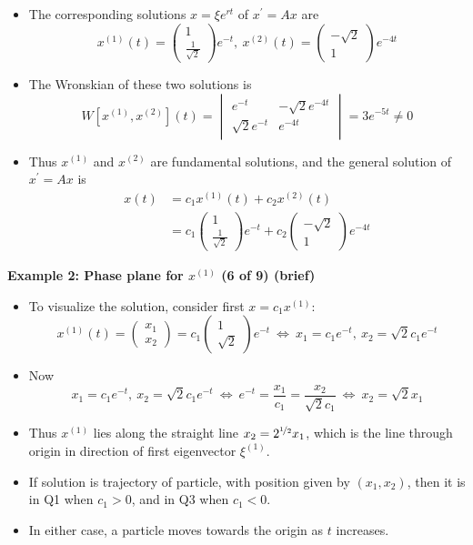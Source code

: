 \documentclass[11pt,a4paper]{article}
\begin{document}
	\begin{itemize}
		\item The corresponding solutions $x = \xi e^{rt}$ of $x^\prime = Ax$ are
		$$
		x^{(1)}(t)=
		\begin{pmatrix}
			1\\
			\frac{1}{\sqrt{2}}
		\end{pmatrix}e^{-t},\ 
		x^{(2)}(t) =
		\begin{pmatrix}
			-\sqrt{2}\\
			1
		\end{pmatrix}e^{-4t}
		$$
		\item The Wronskian of these two solutions is
		$$
		W[x^{(1)},x^{(2)}](t) =
		\begin{vmatrix}
			e^{-t} & -\sqrt{2}e^{-4t}\\
			\sqrt{2}e^{-t} & e^{-4t}
		\end{vmatrix} = 3e^{-5t} \neq 0
		$$
		\item Thus $x^{(1)}$ and $x^{(2)}$ are fundamental solutions, and the general solution of $x^\prime = Ax$ is
		\begin{align*}
			x(t) &= c_1x^{(1)}(t) + c_2x^{(2)}(t)\\
			&= c_1
			\begin{pmatrix}
				1\\
				\frac{1}{\sqrt{2}}
			\end{pmatrix}e^{-t} + c_2
			\begin{pmatrix}
				-\sqrt{2}\\
				1
			\end{pmatrix}e^{-4t}
		\end{align*}
	\end{itemize}
	\textbf{Example 2: Phase plane for $x^{(1)}$ (6 of 9) (brief)}
	\begin{itemize}
		\item To visualize the solution, consider first $x = c_1x^{(1)}$:
		$$
		x^{(1)}(t) =
		\begin{pmatrix}
			x_1\\
			x_2
		\end{pmatrix} = c_1
		\begin{pmatrix}
			1 \\
			\sqrt{2}
		\end{pmatrix}e^{-t}\ \Leftrightarrow\ 
		x_1 = c_1e^{-t},\ x_2 = \sqrt{2}c_1e^{-t}
		$$
		\item Now
		$$
		x_1 = c_1e^{-t},\ x_2 = \sqrt{2}c_1e^{-t}\ \Leftrightarrow\ e^{-t} = \frac{x_1}{c_1} = \frac{x_2}{\sqrt{2}c_1}\ \Leftrightarrow\ x_2 = \sqrt{2}x_1
		$$
		\item Thus $x^{(1)}$ lies along the straight line $x_2 = 2^{\nicefrac{1}{2}}x_1$, which is the line through origin in direction of first eigenvector $\xi^{(1)}$.
		\item If solution is trajectory of particle, with position given by $(x_1, x_2)$, then it is in Q1 when $c_1 > 0$, and in Q3 when $c_1 < 0$.
		\item In either case, a particle moves towards the origin as $t$ increases.
	\end{itemize}
\end{document}
